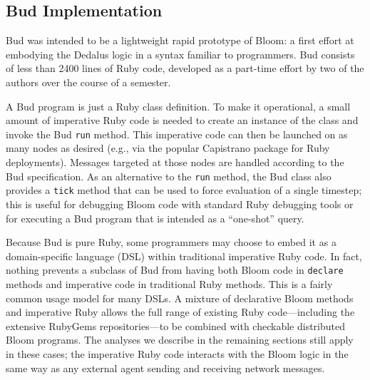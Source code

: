\subsection{Bud Implementation}

Bud was intended to be a lightweight rapid prototype of Bloom: a first effort at embodying the Dedalus logic in a syntax familiar to programmers.  Bud consists of less than 2400 lines of Ruby code, developed as a part-time effort by two of the authors over the course of a semester.


A Bud program is just a Ruby class definition.  To make it operational, a small
amount of imperative Ruby code is needed to create an instance of the class and
invoke the Bud \texttt{run} method.  This imperative code can then be launched
on as many nodes as desired (e.g., via the popular Capistrano package for Ruby
deployments).  Messages targeted at those nodes are handled according to the Bud
specification.  As an alternative to the \texttt{run} method, the Bud class also
provides a \texttt{tick} method that can be used to force evaluation of a single
timestep; this is useful for debugging Bloom code with standard Ruby debugging
tools or for executing a Bud program that is intended as a ``one-shot'' query.

Because Bud is pure Ruby, some programmers may choose to embed it as a
domain-specific language (DSL) within traditional imperative Ruby code.  In
fact, nothing prevents a subclass of Bud from having both Bloom code in
\texttt{declare} methods and imperative code in traditional Ruby methods.  This
is a fairly common usage model for many DSLs. A mixture of declarative Bloom
methods and imperative Ruby allows the full range of existing Ruby
code---including the extensive RubyGems repositories---to be combined with
checkable distributed Bloom programs. The analyses we describe in the remaining
sections still apply in these cases; the imperative Ruby code interacts with the
Bloom logic in the same way as any external agent sending and receiving network
messages.
